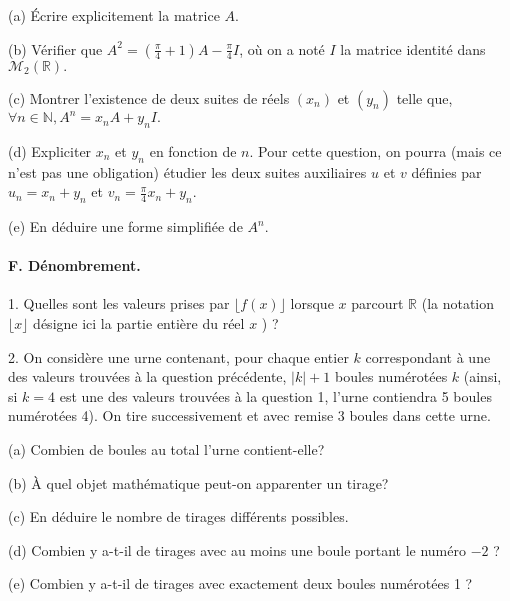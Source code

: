 \documentclass[a4paper, 11pt,reqno]{article}
\begin{document}
\begin{exercice}
(a) Écrire explicitement la matrice $A$.

(b) Vérifier que $A^{2}=\left(\frac{\pi}{4}+1\right) A-\frac{\pi}{4} I$, où on a noté $I$ la matrice identité dans $\mathcal{M}_{2}(\mathbb{R}) .$

(c) Montrer l'existence de deux suites de réels $\left(x_{n}\right)$ et $\left(y_{n}\right)$ telle que, $\forall n \in \mathbb{N}, A^{n}=x_{n} A+y_{n} I .$

(d) Expliciter $x_{n}$ et $y_{n}$ en fonction de $n$. Pour cette question, on pourra (mais ce n'est pas une obligation) étudier les deux suites auxiliaires $u$ et $v$ définies par $u_{n}=x_{n}+y_{n}$ et $v_{n}=\frac{\pi}{4} x_{n}+y_{n}$.

(e) En déduire une forme simplifiée de $A^{n}$.

\paragraph{F. Dénombrement.}

1. Quelles sont les valeurs prises par $\lfloor f(x)\rfloor$ lorsque $x$ parcourt $\mathbb{R}$ (la notation $\lfloor x\rfloor$ désigne ici la partie entière du réel $x$ ) ?

2. On considère une urne contenant, pour chaque entier $k$ correspondant à une des valeurs trouvées à la question précédente, $|k|+1$ boules numérotées $k$ (ainsi, si $k=4$ est une des valeurs trouvées à la question 1, l'urne contiendra 5 boules numérotées 4). On tire successivement et avec remise 3 boules dans cette urne.

(a) Combien de boules au total l'urne contient-elle?

(b) À quel objet mathématique peut-on apparenter un tirage?

(c) En déduire le nombre de tirages différents possibles.

(d) Combien y a-t-il de tirages avec au moins une boule portant le numéro $-2$ ?

(e) Combien y a-t-il de tirages avec exactement deux boules numérotées 1 ?

\end{exercice}
\end{document}

